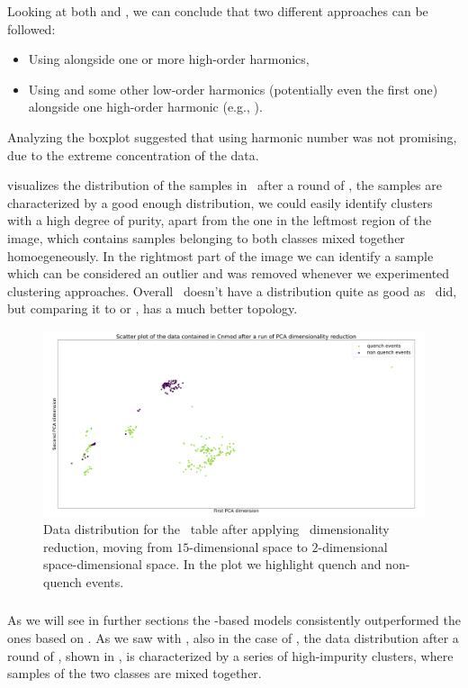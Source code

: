 Looking at both  and , we can conclude that two different
approaches can be followed:
\begin{itemize}
	\item Using \cnmod[2] alongside one or more high-order harmonics,
	\item Using \cnmod[3] and some other low-order harmonics (potentially even the
	      first one) alongside one high-order harmonic (e.g., \cnmod[14]).
\end{itemize}
Analyzing the boxplot suggested that using harmonic number \cnmod[2] was not promising, due to the extreme
concentration of the data.

 visualizes the distribution of the samples in \cnmod\ after a round of \pca,
the samples are characterized by a good enough distribution, we could easily identify clusters with
a high degree of purity, apart from the one in the leftmost region of the image, which contains
samples belonging to both classes mixed together homoegeneously. In the rightmost part of the image
we can identify a sample which can be considered an outlier and was removed whenever we experimented
clustering approaches. Overall \cnmod\ doesn't have a distribution quite as good as \an\ did, but comparing it to  or , has a much better topology.
\begin{figure}[!ht]
	\centering
	\includegraphics[width=\linewidth]{img/Cnmod_distribution.png}
	\caption{Data distribution for the \cnmod\ table after applying \pca\ dimensionality
		reduction, moving from $15$-dimensional space to $2$-dimensional space-dimensional
		space. In the plot we highlight quench and non-quench events.} \label{fig:cnmod-dist}
\end{figure}

\subsubsection{\phin}
As we will see in further sections the \phin-based models consistently outperformed the ones based
on \bn. As we saw with \bn, also in the case of \phin, the data distribution after a round of \pca,
shown in , is characterized by a series of high-impurity clusters, where samples of the two classes are mixed together.


